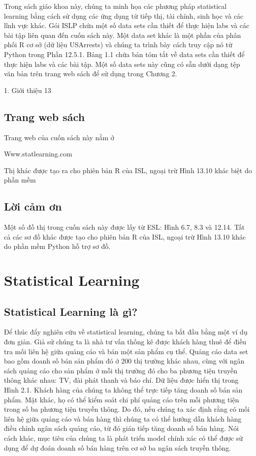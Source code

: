 Trong sách giáo khoa này, chúng ta minh họa các phương pháp statistical learning bằng cách sử dụng các ứng dụng từ tiếp thị, tài chính, sinh học và các lĩnh vực khác. Gói ISLP chứa một số data sets cần thiết để thực hiện labs và các bài tập liên quan đến cuốn sách này. Một data set khác là một phần của phân phối R cơ sở (dữ liệu USArrests) và chúng ta trình bày cách truy cập nó từ Python trong Phần 12.5.1. Bảng 1.1 chứa bản tóm tắt về data sets cần thiết để thực hiện labs và các bài tập. Một số data sets này cũng có sẵn dưới dạng tệp văn bản trên trang web sách để sử dụng trong Chương 2.

1. Giới thiệu 13

\subsection{Trang web sách}

Trang web của cuốn sách này nằm ở

Www.statlearning.com

Thị khác được tạo ra cho phiên bản R của ISL, ngoại trừ Hình 13.10 khác biệt do phần mềm

\subsection{Lời cảm ơn}

Một số đồ thị trong cuốn sách này được lấy từ ESL: Hình 6.7, 8.3 và 12.14. Tất cả các sơ đồ khác được tạo cho phiên bản R của ISL, ngoại trừ Hình 13.10 khác do phần mềm Python hỗ trợ sơ đồ.

\section{Statistical Learning}

\subsection{Statistical Learning là gì?}

Để thúc đẩy nghiên cứu về statistical learning, chúng ta bắt đầu bằng một ví dụ đơn giản. Giả sử chúng ta là nhà tư vấn thống kê được khách hàng thuê để điều tra mối liên hệ giữa quảng cáo và bán một sản phẩm cụ thể. Quảng cáo data set bao gồm doanh số bán sản phẩm đó ở 200 thị trường khác nhau, cùng với ngân sách quảng cáo cho sản phẩm ở mỗi thị trường đó cho ba phương tiện truyền thông khác nhau: TV, đài phát thanh và báo chí. Dữ liệu được hiển thị trong Hình 2.1. Khách hàng của chúng ta không thể trực tiếp tăng doanh số bán sản phẩm. Mặt khác, họ có thể kiểm soát chi phí quảng cáo trên mỗi phương tiện trong số ba phương tiện truyền thông. Do đó, nếu chúng ta xác định rằng có mối liên hệ giữa quảng cáo và bán hàng thì chúng ta có thể hướng dẫn khách hàng điều chỉnh ngân sách quảng cáo, từ đó gián tiếp tăng doanh số bán hàng. Nói cách khác, mục tiêu của chúng ta là phát triển model chính xác có thể được sử dụng để dự đoán doanh số bán hàng trên cơ sở ba ngân sách truyền thông.

